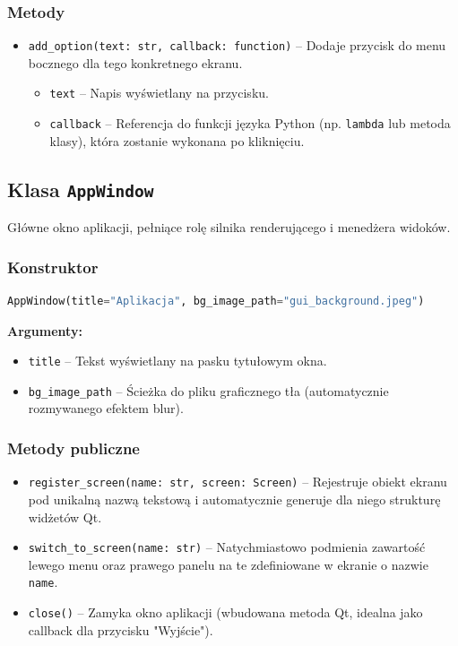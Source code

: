 \documentclass[a4paper,12pt]{article}
\begin{document}
\subsubsection*{Metody}
\begin{itemize}
    \item \texttt{add_option(text: str, callback: function)} -- Dodaje przycisk do menu bocznego dla tego konkretnego ekranu.
    \begin{itemize}
        \item \texttt{text} -- Napis wyświetlany na przycisku.
        \item \texttt{callback} -- Referencja do funkcji języka Python (np. \texttt{lambda} lub metoda klasy), która zostanie wykonana po kliknięciu.
    \end{itemize}
\end{itemize}

\subsection{Klasa \texttt{AppWindow}}
Główne okno aplikacji, pełniące rolę silnika renderującego i menedżera widoków.

\subsubsection*{Konstruktor}
\begin{lstlisting}[language=Python]
AppWindow(title="Aplikacja", bg_image_path="gui_background.jpeg")
\end{lstlisting}
\textbf{Argumenty:}
\begin{itemize}
    \item \texttt{title} -- Tekst wyświetlany na pasku tytułowym okna.
    \item \texttt{bg_image_path} -- Ścieżka do pliku graficznego tła (automatycznie rozmywanego efektem blur).
\end{itemize}

\subsubsection*{Metody publiczne}
\begin{itemize}
    \item \texttt{register_screen(name: str, screen: Screen)} -- Rejestruje obiekt ekranu pod unikalną nazwą tekstową i automatycznie generuje dla niego strukturę widżetów Qt.
    \item \texttt{switch_to_screen(name: str)} -- Natychmiastowo podmienia zawartość lewego menu oraz prawego panelu na te zdefiniowane w ekranie o nazwie \texttt{name}.
    \item \texttt{close()} -- Zamyka okno aplikacji (wbudowana metoda Qt, idealna jako callback dla przycisku "Wyjście").
\end{itemize}
\end{document}
